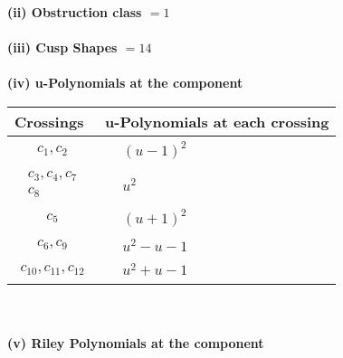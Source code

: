 \documentclass[1p]{elsarticle_modified}
\theoremstyle{definition}
\begin{document}
\flushleft \textbf{(ii) Obstruction class $= 1$}\\~\\
\flushleft \textbf{(iii) Cusp Shapes $= 14$}\\~\\
\newpage\renewcommand{\arraystretch}{1}
\flushleft \textbf{(iv) u-Polynomials at the component}\newline \\
\begin{tabular}{m{50pt}|m{274pt}}
Crossings & \hspace{64pt}u-Polynomials at each crossing \\
\hline $$\begin{aligned}c_{1},c_{2}\end{aligned}$$&$\begin{aligned}
&(u-1)^2
\end{aligned}$\\
\hline $$\begin{aligned}c_{3},c_{4},c_{7}\\c_{8}\end{aligned}$$&$\begin{aligned}
&u^2
\end{aligned}$\\
\hline $$\begin{aligned}c_{5}\end{aligned}$$&$\begin{aligned}
&(u+1)^2
\end{aligned}$\\
\hline $$\begin{aligned}c_{6},c_{9}\end{aligned}$$&$\begin{aligned}
&u^2- u-1
\end{aligned}$\\
\hline $$\begin{aligned}c_{10},c_{11},c_{12}\end{aligned}$$&$\begin{aligned}
&u^2+u-1
\end{aligned}$\\
\hline
\end{tabular}\\~\\
\newpage\renewcommand{\arraystretch}{1}
\flushleft \textbf{(v) Riley Polynomials at the component}\newline \\
\end{document}
